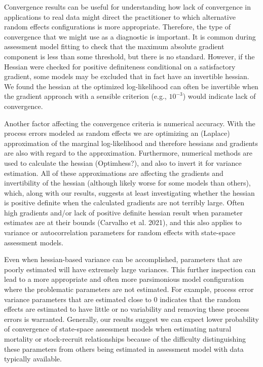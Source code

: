 \documentclass[
  12pt,
]{article}
\begin{document}
Convergence results can be useful for understanding how lack of
convergence in applications to real data might direct the practitioner
to which alternative random effects configurations is more appropriate.
Therefore, the type of convergence that we might use as a diagnostic is
important. It is common during assessment model fitting to check that
the maximum absolute gradient component is less than some threshold, but
there is no standard. However, if the Hessian were checked for positive
definiteness conditional on a satisfactory gradient, some models may be
excluded that in fact have an invertible hessian. We found the hessian
at the optimized log-likelihood can often be invertible when the
gradient approach with a sensible criterion (e.g., \(10^{-3}\)) would
indicate lack of convergence.

Another factor affecting the convergence criteria is numerical accuracy.
With the process errors modeled as random effects we are optimizing an
(Laplace) approximation of the marginal log-likelihood and therefore
hessians and gradients are also with regard to the approximation.
Furthermore, numerical methods are used to calculate the hessian
(Optimhess?), and also to invert it for variance estimation. All of
these approximations are affecting the gradients and invertibility of
the hessian (although likely worse for some models than others), which,
along with our results, suggests at least investigating whether the
hessian is positive definite when the calculated gradients are not
terribly large. Often high gradients and/or lack of positive definite
hessian result when parameter estimates are at their bounds (Carvalho et
al. 2021), and this also applies to variance or autocorrelation
parameters for random effects with state-space assessment models.

Even when hessian-based variance can be accomplished, parameters that
are poorly estimated will have extremely large variances. This further
inspection can lead to a more appropriate and often more parsimonious
model configuration where the problematic parameters are not estimated.
For example, process error variance parameters that are estimated close
to 0 indicates that the random effects are estimated to have little or
no variability and removing these process errors is warranted.
Generally, our results suggest we can expect lower probability of
convergence of state-space assessment models when estimating natural
mortality or stock-recruit relationships because of the difficulty
distinguishing these parameters from others being estimated in
assessment model with data typically available.
\end{document}
